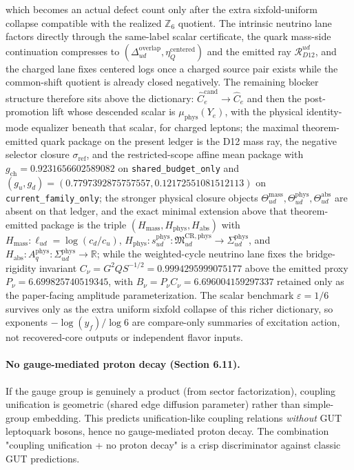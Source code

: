 which becomes an actual defect count only after the extra sixfold-uniform collapse compatible with the realized \(\mathbb Z_6\) quotient. The intrinsic neutrino lane factors directly through the same-label scalar certificate, the quark mass-side continuation compresses to \((\Delta_{ud}^{\mathrm{overlap}},\eta_Q^{\mathrm{centered}})\) and the emitted ray \(\mathcal R_{D12}^{ud}\), and the charged lane fixes centered logs once a charged source pair exists while the common-shift quotient is already closed negatively. The remaining blocker structure therefore sits above the dictionary: \(\widehat C_e^{\mathrm{cand}}\to\widehat C_e\) and then the post-promotion lift whose descended scalar is \(\mu_{\mathrm{phys}}(Y_e)\), with the physical identity-mode equalizer beneath that scalar, for charged leptons; the maximal theorem-emitted quark package on the present ledger is the D12 mass ray, the negative selector closure \(\sigma_{\mathrm{ref}}\), and the restricted-scope affine mean package with \(g_{\mathrm{ch}}=0.9231656602589082\) on \texttt{shared\_budget\_only} and \((g_u,g_d)=(0.7797392875757557,0.12172551081512113)\) on \texttt{current\_family\_only}; the stronger physical closure objects \(\Theta_{ud}^{\mathrm{mass}},\Theta_{ud}^{\mathrm{phys}},\Theta_{ud}^{\mathrm{abs}}\) are absent on that ledger, and the exact minimal extension above that theorem-emitted package is the triple \((H_{\mathrm{mass}},H_{\mathrm{phys}},H_{\mathrm{abs}})\) with \(H_{\mathrm{mass}}:\ell_{ud}=\log(c_d/c_u)\), \(H_{\mathrm{phys}}:s_{ud}^{\mathrm{phys}}:\mathfrak M_{ud}^{\mathrm{CR,phys}}\to\Sigma_{ud}^{\mathrm{phys}}\), and \(H_{\mathrm{abs}}:A_q^{\mathrm{phys}}:\Sigma_{ud}^{\mathrm{phys}}\to\mathbb R\); while the weighted-cycle neutrino lane fixes the bridge-rigidity invariant \(C_\nu=G^2Q S^{-1/2}=0.9994295999075177\) above the emitted proxy \(P_\nu=6.699825740519345\), with \(B_\nu=P_\nu C_\nu=6.696004159297337\) retained only as the paper-facing amplitude parameterization. The scalar benchmark \(\varepsilon=1/6\) survives only as the extra uniform sixfold collapse of this richer dictionary, so exponents \(-\log(y_f)/\log 6\) are compare-only summaries of excitation action, not recovered-core outputs or independent flavor inputs.

\paragraph{No gauge-mediated proton decay (Section 6.11).} If the gauge group is genuinely a product (from sector factorization), coupling unification is geometric (shared edge diffusion parameter) rather than simple-group embedding. This predicts unification-like coupling relations \emph{without} GUT leptoquark bosons, hence no gauge-mediated proton decay. The combination "coupling unification + no proton decay" is a crisp discriminator against classic GUT predictions.

